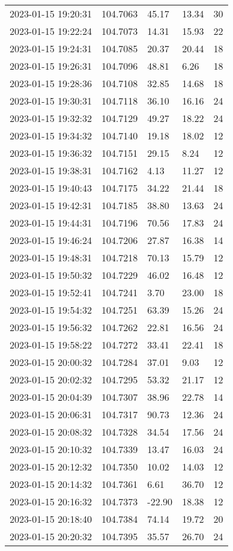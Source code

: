 \documentclass{nature_plusfigure}
\begin{document}
\begin{supplement}
\begin{center}
\begin{longtable}{lllll}
2023-01-15 19:20:31 & 104.7063 & 45.17 & 13.34 & 30 \\ 
2023-01-15 19:22:24 & 104.7073 & 14.31 & 15.93 & 22 \\ 
2023-01-15 19:24:31 & 104.7085 & 20.37 & 20.44 & 18 \\ 
2023-01-15 19:26:31 & 104.7096 & 48.81 & 6.26 & 18 \\ 
2023-01-15 19:28:36 & 104.7108 & 32.85 & 14.68 & 18 \\ 
2023-01-15 19:30:31 & 104.7118 & 36.10 & 16.16 & 24 \\ 
2023-01-15 19:32:32 & 104.7129 & 49.27 & 18.22 & 24 \\ 
2023-01-15 19:34:32 & 104.7140 & 19.18 & 18.02 & 12 \\ 
2023-01-15 19:36:32 & 104.7151 & 29.15 & 8.24 & 12 \\ 
2023-01-15 19:38:31 & 104.7162 & 4.13 & 11.27 & 12 \\ 
2023-01-15 19:40:43 & 104.7175 & 34.22 & 21.44 & 18 \\ 
2023-01-15 19:42:31 & 104.7185 & 38.80 & 13.63 & 24 \\ 
2023-01-15 19:44:31 & 104.7196 & 70.56 & 17.83 & 24 \\ 
2023-01-15 19:46:24 & 104.7206 & 27.87 & 16.38 & 14 \\ 
2023-01-15 19:48:31 & 104.7218 & 70.13 & 15.79 & 12 \\ 
2023-01-15 19:50:32 & 104.7229 & 46.02 & 16.48 & 12 \\ 
2023-01-15 19:52:41 & 104.7241 & 3.70 & 23.00 & 18 \\ 
2023-01-15 19:54:32 & 104.7251 & 63.39 & 15.26 & 24 \\ 
2023-01-15 19:56:32 & 104.7262 & 22.81 & 16.56 & 24 \\ 
2023-01-15 19:58:22 & 104.7272 & 33.41 & 22.41 & 18 \\ 
2023-01-15 20:00:32 & 104.7284 & 37.01 & 9.03 & 12 \\ 
2023-01-15 20:02:32 & 104.7295 & 53.32 & 21.17 & 12 \\ 
2023-01-15 20:04:39 & 104.7307 & 38.96 & 22.78 & 14 \\ 
2023-01-15 20:06:31 & 104.7317 & 90.73 & 12.36 & 24 \\ 
2023-01-15 20:08:32 & 104.7328 & 34.54 & 17.56 & 24 \\ 
2023-01-15 20:10:32 & 104.7339 & 13.47 & 16.03 & 24 \\ 
2023-01-15 20:12:32 & 104.7350 & 10.02 & 14.03 & 12 \\ 
2023-01-15 20:14:32 & 104.7361 & 6.61 & 36.70 & 12 \\ 
2023-01-15 20:16:32 & 104.7373 & -22.90 & 18.38 & 12 \\ 
2023-01-15 20:18:40 & 104.7384 & 74.14 & 19.72 & 20 \\ 
2023-01-15 20:20:32 & 104.7395 & 35.57 & 26.70 & 24 \\ 
\hline 
\end{longtable} 
\end{center} 




\end{supplement}
\end{document}
